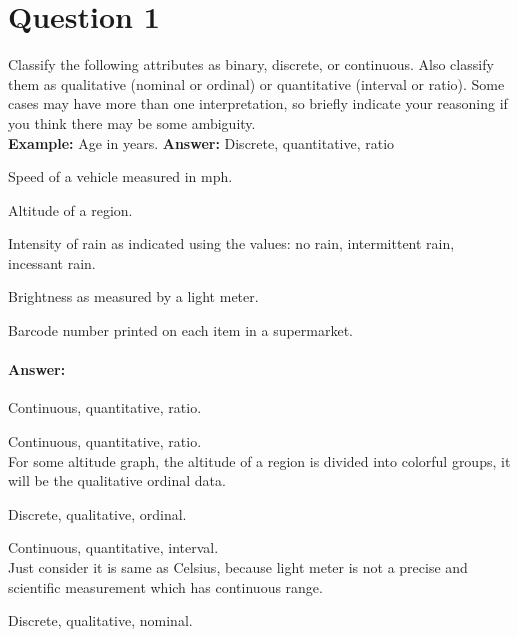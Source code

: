 \documentclass{article}
\begin{document}
\pagestyle{fancy}

%

\section*{Question 1}{
    Classify the following attributes as binary, discrete, or continuous. Also classify them as qualitative (nominal or ordinal) or quantitative (interval or ratio). Some cases may have more than one interpretation, so briefly indicate your reasoning if you think there may be some ambiguity.\\
    \textbf{Example:} Age in years. \textbf{Answer:} Discrete, quantitative, ratio
    \begin{enumerate}{
        \item Speed of a vehicle measured in mph.
        \item Altitude of a region.
        \item Intensity of rain as indicated using the values: no rain, intermittent rain, incessant rain. 
        \item Brightness as measured by a light meter.
        \item Barcode number printed on each item in a supermarket.
    }
    \end{enumerate}

    \paragraph{Answer: }{
        \begin{enumerate}{
            \item Continuous, quantitative, ratio.\\
            \item Continuous, quantitative, ratio.\\
            For some altitude graph, the altitude of a region is divided into colorful groups, it will be the qualitative ordinal data.
            \item Discrete, qualitative, ordinal.
            \item Continuous, quantitative, interval.\\
            Just consider it is same as Celsius, because light meter is not a precise and scientific measurement which has continuous range.
            \item Discrete, qualitative, nominal.
        }
        \end{enumerate}    
    }
}
\end{document}
